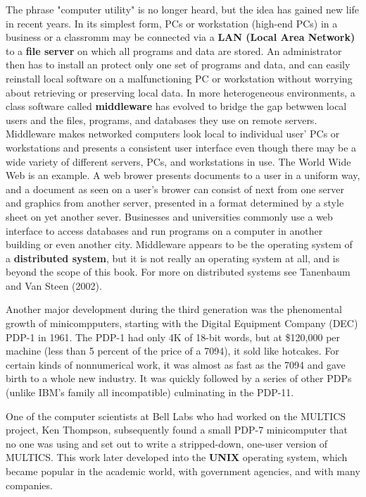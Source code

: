 \documentclass{book}
\newcommand {\kw}  [1] {\textbf{#1}}
\begin{document}
The phrase "computer utility" is no longer heard, but the idea has gained new life in recent years.
In its simplest form, PCs or workstation (high-end PCs) in a business or a classromm 
may be connected via a \kw{LAN (Local Area Network)} to a \kw{file server} on which all programs and data are stored.
An administrator then has to install an protect only one set of programs and data, 
and can easily reinstall local software on a malfunctioning PC or workstation without worrying about retrieving or preserving local data.
In more heterogeneous environments, a class software called \kw{middleware} has evolved 
to bridge the gap betwwen local users and the files, programs, and databases they use on remote servers.
Middleware makes networked computers look local to individual user' PCs or workstations 
and presents a consistent user interface even though there may be a wide variety of different servers, PCs, and workstations in use.
The World Wide Web is an example.
A web brower presents documents to a user in a uniform way, and a document as seen on a user's brower can consist of next from one server 
and graphics from another server, presented in a format determined by a style sheet on yet another sever.
Businesses and universities commonly use a web interface to access databases and run programs on a computer in another building or even another city.
Middleware appears to be the operating system of a \kw{distributed system}, 
but it is not really an operating system at all, and is beyond the scope of this book.
For more on distributed systems see Tanenbaum and Van Steen (2002).

Another major development during the third generation was the phenomental growth of minicompputers, 
starting with the Digital Equipment Company (DEC) PDP-1 in 1961.
The PDP-1 had only 4K of 18-bit words, but at \$120,000 per machine (less than 5 percent of the price of a 7094), it sold like hotcakes.
For certain kinds of nonnumerical work, it was almost as fast as the 7094 and gave birth to a whole new industry.
It was quickly followed by a series of other PDPs (unlike IBM's family all incompatible) culminating in the PDP-11.

One of the computer scientists at Bell Labs who had worked on the MULTICS project, Ken Thompson, 
subsequently found a small PDP-7 minicomputer that no one was using and set out to write a stripped-down, one-user version of MULTICS.
This work later developed into the \kw{UNIX} operating system, which became popular in the academic world, 
with government agencies, and with many companies.
\end{document}
